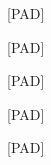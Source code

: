 \documentclass[varwidth=150mm]{standalone}
\begin{document}
\begin{CJK*}{UTF8}{gbsn}
{{{\colorbox{red!0.0}{\strut [PAD]} \colorbox{red!0.0}{\strut [PAD]} \colorbox{red!0.0}{\strut [PAD]} \colorbox{red!0.0}{\strut [PAD]} \colorbox{red!0.0}{\strut [PAD]}
}}}
\end{CJK*}
\end{document}

